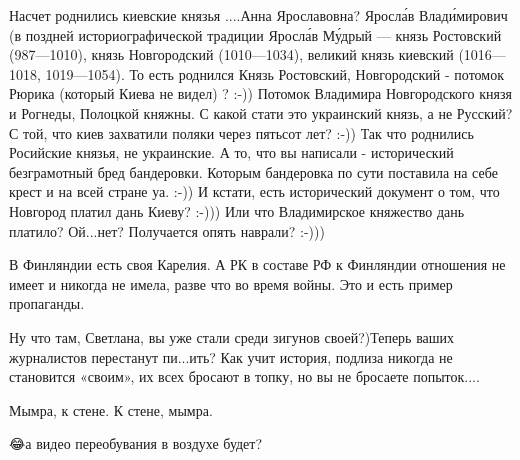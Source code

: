 \begin{itemize}
Насчет роднились киевские князья ....Анна Ярославовна? Яросла́в Влади́мирович (в поздней историографической традиции Яросла́в Му́дрый — князь Ростовский (987—1010), князь Новгородский (1010—1034), великий князь киевский (1016—1018, 1019—1054). То есть роднился Князь Ростовский, Новгородский - потомок Рюрика (который Киева не видел) ? :-)) Потомок Владимира Новгородского князя и Рогнеды, Полоцкой княжны. С какой стати это украинский князь, а не Русский? С той, что киев захватили поляки через пятьсот лет? :-)) Так что роднились Росийские князья, не украинские. А то, что вы написали - исторический безграмотный бред бандеровки. Которым бандеровка по сути поставила на себе крест и на всей стране уа. :-)) И кстати, есть исторический документ о том, что Новгород платил дань Киеву? :-))) Или что Владимирское княжество дань платило? Ой...нет? Получается опять наврали? :-)))

 
В Финляндии есть своя Карелия. А РК в составе РФ к Финляндии отношения не имеет
и никогда не имела, разве что во время войны. Это и есть пример пропаганды.

 
Ну что там, Светлана, вы уже стали среди зигунов своей?)Теперь ваших
журналистов перестанут пи...ить? Как учит история, подлиза никогда не становится
«своим», их всех бросают в топку, но вы не бросаете попыток....👏


 
Мымра, к стене. К стене, мымра.

 
😂а видео переобувания в воздухе будет?


\end{itemize}
